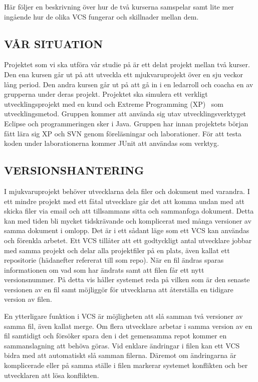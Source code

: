 Här följer en beskrivning över hur de två kurserna samspelar samt lite mer ingående hur de olika VCS fungerar och skillnader mellan dem.
\subsection{VÅR SITUATION}

Projektet som vi ska utföra vår studie på är ett delat projekt mellan två kurser. Den ena kursen går ut på att utveckla ett mjukvaruprojekt över en sju veckor lång period. Den andra kursen går ut på att gå in i en ledarroll och coacha en av grupperna under deras projekt. Projektet ska simulera ett verkligt utvecklingsprojekt med en kund och Extreme Programming (XP)~\cite{BeckXP} som utvecklingsmetod. Gruppen kommer att använda sig utav utvecklingsverktyget Eclipse och programmeringen sker i Java. Gruppen har innan projektets början fått lära sig XP och SVN genom föreläsningar och laborationer. För att testa koden under laborationerna kommer JUnit att användas som verktyg.


\subsection{VERSIONSHANTERING}

I mjukvaruprojekt behöver utvecklarna dela filer och dokument med varandra. I ett mindre projekt med ett fåtal utvecklare går det att komma undan med att skicka filer via email och att tillsammans sitta och sammanfoga dokument. Detta kan med tiden bli mycket tidskrävande och komplicerat med många versioner av samma dokument i omlopp. Det är i ett sådant läge som ett VCS kan användas och förenkla arbetet. Ett VCS tillåter att ett godtyckligt antal utvecklare jobbar med samma projekt och delar alla projektfiler på en plats, även kallat ett repositorie (hädanefter refererat till som repo). När en fil ändras sparas informationen om vad som har ändrats samt att filen får ett nytt versionsnummer. På detta vis håller systemet reda på vilken som är den senaste versionen av en fil samt möjliggör för utvecklarna att återställa en tidigare version av filen.

En ytterligare funktion i VCS är möjligheten att slå samman två versioner av samma fil, även kallat merge. Om flera utvecklare arbetar i samma version av en fil samtidigt och försöker spara den i det gemensamma repot kommer en sammanslagning att behöva göras. Vid enklare ändringar i filen kan ett VCS bidra med att automatiskt slå samman filerna. Däremot om ändringarna är komplicerade eller på samma ställe i filen markerar systemet konflikten och ber utvecklaren att lösa konflikten.

